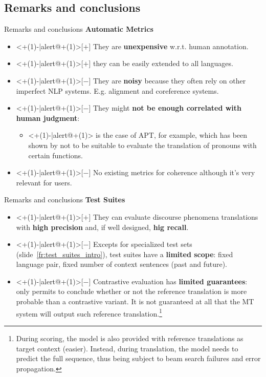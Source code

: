 
\subsection{Remarks and conclusions}

\begin{frame}{Remarks and conclusions}
	\textbf{Automatic Metrics}
	\begin{itemize}
		\item<+(1)-|alert@+(1)>[$+$] They are \textbf{unexpensive} w.r.t. human annotation.
		\item<+(1)-|alert@+(1)>[$+$] they can be easily extended to all languages.
		\item<+(1)-|alert@+(1)>[$-$] They are \textbf{noisy} because they often rely on other imperfect NLP systems. E.g. alignment and coreference systems.
		\item<+(1)-|alert@+(1)>[$-$] They might \textbf{not be enough correlated with human judgment}:
		\begin{itemize}
			\item<+(1)-|alert@+(1)> is the case of APT, for example, which has been shown by \cite{guillou_automatic_2018} not to be suitable to evaluate the translation of pronouns with certain functions.
		\end{itemize}
		\item<+(1)-|alert@+(1)>[$-$] No existing metrics for coherence although it's very relevant for users.
	\end{itemize}
\end{frame}

\begin{frame}{Remarks and conclusions}
	\textbf{Test Suites}
	\begin{itemize}
		\item<+(1)-|alert@+(1)>[$+$] They can evaluate discourse phenomena translations with \textbf{high precision} and, if well designed, \textbf{hig recall}.
		\item<+(1)-|alert@+(1)>[$-$] Excepts for specialized test sets (slide~\ref{fr:test_suites_intro}), test suites have a \textbf{limited scope}: fixed language pair, fixed number of context sentences (past and future). 
		\item<+(1)-|alert@+(1)>[$-$] Contrastive evaluation has \textbf{limited guarantees}: only permits to conclude whether or not the reference translation is more probable than a contrastive variant. It is not guaranteed at all that the MT system will output such reference translation.\footnote{During scoring, the model is also provided with reference translations as target context (easier). Instead, during translation, the model needs to predict the full sequence, thus being subject to beam search failures and error propagation.} 
	\end{itemize}
\end{frame}

